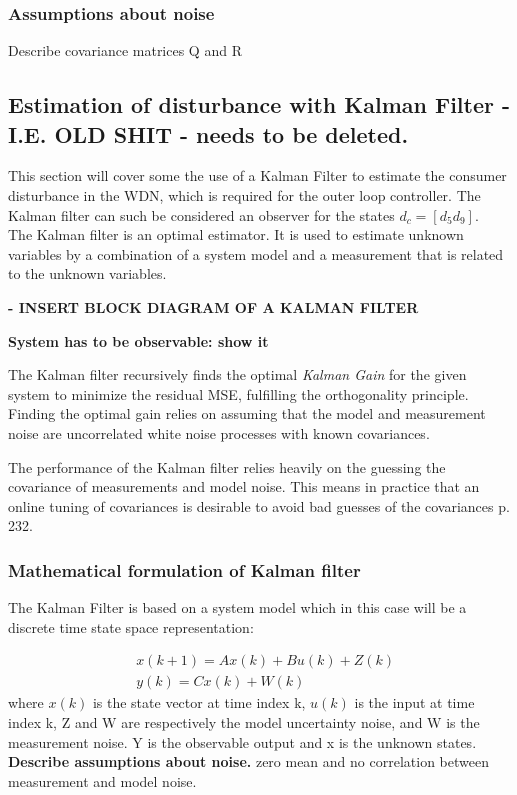 \subsubsection{Assumptions about noise}
Describe covariance matrices Q and R\\



\clearpage \newpage
\subsection{Estimation of disturbance with Kalman Filter - I.E. OLD SHIT - needs to be deleted.}
This section will cover some the use of a Kalman Filter to estimate the consumer disturbance in the WDN, which is required for the outer loop controller. The Kalman filter can such be considered an observer for the states $d_c = [d_5 d_9]$. \\
The Kalman filter is an optimal estimator. It is used to estimate unknown variables by a combination of a system model and a measurement that is related to the unknown variables. 

\textbf{- INSERT BLOCK DIAGRAM OF A KALMAN FILTER }

\textbf{System has to be observable: show it}

The Kalman filter recursively finds the optimal \textit{Kalman Gain} for the given system to minimize the residual MSE, fulfilling the orthogonality principle. Finding the optimal gain relies on assuming that the model and measurement noise are uncorrelated white noise processes with known covariances. 

The performance of the Kalman filter relies heavily on the guessing the covariance of measurements and model noise. This means in practice that an online tuning of covariances is desirable to avoid bad guesses of the covariances \cite{Doraiswami2014} p. 232.


\subsubsection{Mathematical formulation of Kalman filter}
The Kalman Filter is based on a system model which in this case will be a discrete time state space representation: 

\begin{align}
	&x(k+1) = Ax(k) + Bu(k) + Z(k)  \label{eq:KalmanSystemEquations} \\
	&y(k) = Cx(k)+W(k)
\end{align}
where $x(k)$ is the state vector at time index k, $u(k)$ is the input at time index k, 
Z and W are respectively the model uncertainty noise, and W is the measurement noise. Y is the observable output and x is the unknown states. \\
\textbf{Describe assumptions about noise. } zero mean and no correlation between measurement and model noise.\\

